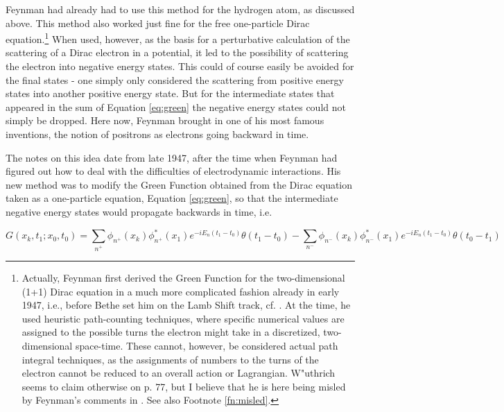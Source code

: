 \documentclass[12pt]{article}
\begin{document}
Feynman had already had to use this method for the hydrogen atom, as discussed above. This method also worked just fine for the free one-particle Dirac equation.\footnote{Actually, Feynman first derived the Green Function for the two-dimensional (1+1) Dirac equation in a much more complicated fashion already in early 1947, i.e., before Bethe set him on the Lamb Shift track, cf. \citep[sec. 4.1.3]{wuethrich_2010_the-genesis}. At the time, he used heuristic path-counting techniques, where specific numerical values are assigned to the possible turns the electron might take in a discretized, two-dimensional space-time. These cannot, however, be considered actual path integral techniques, as the assignments of numbers to the turns of the electron cannot be reduced to an overall action or Lagrangian. W"uthrich seems to claim otherwise on p. 77, but I believe that he is here being misled by Feynman's comments in \cite{feynman_1948_space-time}. See also Footnote \ref{fn:misled}.} When used, however, as the basis for a perturbative calculation of the scattering of a Dirac electron in a potential, it led to the possibility of scattering the electron into negative energy states. This could of course easily be avoided for the final states - one simply only considered the scattering from positive energy states into another positive energy state. But for the intermediate states that appeared in the sum of Equation \ref{eq:green} the negative energy states could not simply be dropped. Here now, Feynman brought in one of his most famous inventions, the notion of positrons as electrons going backward in time.

The notes on this idea date from late 1947, after the time when Feynman had figured out how to deal with the difficulties of electrodynamic interactions. His new method was to modify the Green Function obtained from the Dirac equation taken as a one-particle equation, Equation \ref{eq:green}, so that the intermediate negative energy states would propagate backwards in time, i.e.

\begin{equation}
\label{eq:green2}
G(x_k, t_1; x_0, t_0) = \sum_{n^{+}} \phi_{n^{+}} (x_k) \phi_{n^{+}}^{\ast} (x_1) e^{-i E_n (t_1 - t_0)} \theta (t_1-t_0) - \sum_{n^{-}} \phi_{n^{-}} (x_k) \phi_{n^{-}}^{\ast} (x_1) e^{- i E_n (t_1 - t_0)} \theta (t_0-t_1)
\end{equation}
\end{document}
